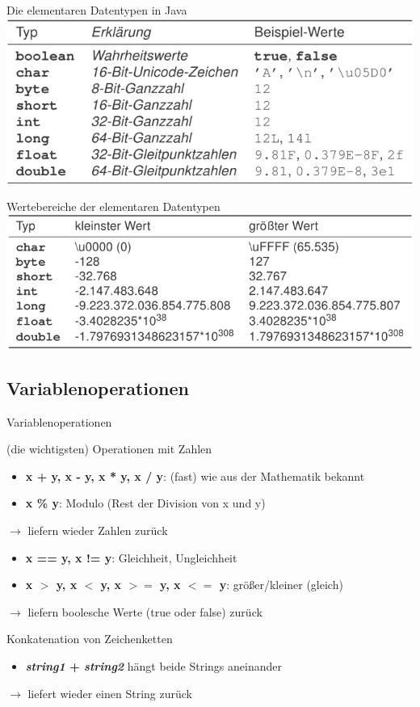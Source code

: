 \documentclass[18pt]{beamer}
\begin{document}
\begin{frame}{Die elementaren Datentypen in Java}
\includegraphics[width=\linewidth]{logos/datentypen}
\end{frame}

\begin{frame}{Wertebereiche der elementaren Datentypen}
\includegraphics[width=\linewidth]{logos/werte}
\end{frame}


\subsection{Variablenoperationen}
\begin{frame}{Variablenoperationen}
\begin{block}{(die wichtigsten) Operationen mit Zahlen}
\begin{itemize}
	\item \textbf{x + y, x - y, x * y, x / y}: (fast) wie aus der Mathematik bekannt
	\item \textbf{x \% y}: Modulo (Rest der Division von x und y)
\end{itemize}
$\rightarrow$ liefern wieder Zahlen zurück
\pause
\begin{itemize}
	\item \textbf{x == y, x != y}: Gleichheit, Ungleichheit
	\item \textbf{x $>$ y, x $<$ y, x $>=$ y, x $<=$ y}: größer/kleiner (gleich)\\
\end{itemize}
$\rightarrow$ liefern boolesche Werte (true oder false) zurück
\end{block}
\pause
\begin{block}{Konkatenation von Zeichenketten}
\begin{itemize}
\item \textbf{\textit{string1} + \textit{string2}} hängt beide Strings aneinander
\end{itemize}
$\rightarrow$ liefert wieder einen String zurück
\end{block}
\end{frame}
\end{document}
